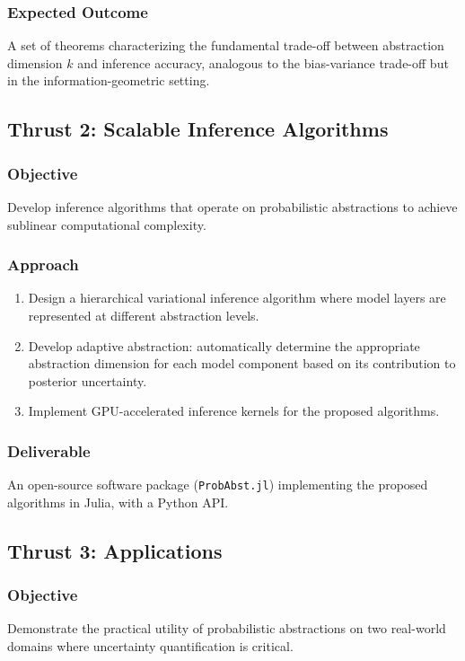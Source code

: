 \documentclass[
    language=english,
    doctype=dissertation-proposal,
    institution=none,
]{../../omnilatex}
\begin{document}
\subsubsection{Expected Outcome}
A set of theorems characterizing the fundamental trade-off between
abstraction dimension $k$ and inference accuracy, analogous to the
bias-variance trade-off but in the information-geometric setting.

\subsection{Thrust 2: Scalable Inference Algorithms}

\subsubsection{Objective}
Develop inference algorithms that operate on probabilistic abstractions to
achieve sublinear computational complexity.

\subsubsection{Approach}
\begin{enumerate}
    \item Design a hierarchical variational inference algorithm where model
          layers are represented at different abstraction levels.
    \item Develop adaptive abstraction: automatically determine the
          appropriate abstraction dimension for each model component based
          on its contribution to posterior uncertainty.
    \item Implement GPU-accelerated inference kernels for the proposed
          algorithms.
\end{enumerate}

\subsubsection{Deliverable}
An open-source software package (\texttt{ProbAbst.jl}) implementing the
proposed algorithms in Julia, with a Python API.

\subsection{Thrust 3: Applications}

\subsubsection{Objective}
Demonstrate the practical utility of probabilistic abstractions on two
real-world domains where uncertainty quantification is critical.
\end{document}
